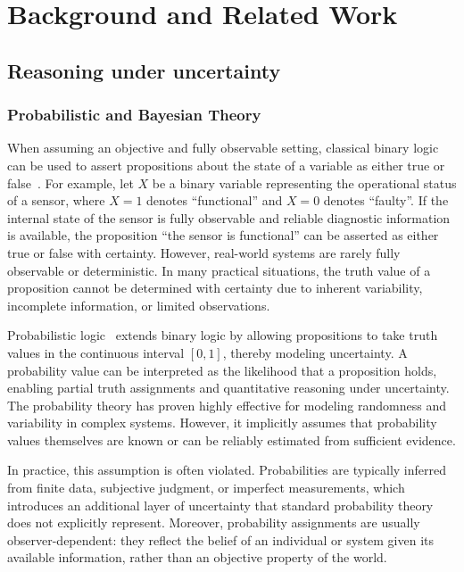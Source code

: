 


\chapter{Background and Related Work}
\label{chap:rw}
\section{Reasoning under uncertainty}
\subsection{Probabilistic and Bayesian Theory}

When assuming an objective and fully observable setting, classical binary logic can be used to assert propositions about the state of a variable as either true or false~\cite{boole1847mathematical}. For example, let $X$ be a binary variable representing the operational status of a sensor, where $X = 1$ denotes ``functional'' and $X = 0$ denotes ``faulty''.  If the internal state of the sensor is fully observable and reliable diagnostic information is available, the proposition ``the sensor is functional'' can be asserted as either true or false with certainty. However, real-world systems are rarely fully observable or deterministic. In many practical situations, the truth value of a proposition cannot be determined with certainty due to inherent variability, incomplete information, or limited observations.

Probabilistic logic~\cite{vonNeumann1956ProbabilisticLogics,Nilsson1986ProbabilisticLogic} extends binary logic by allowing propositions to take truth values in the continuous interval $[0,1]$, thereby modeling uncertainty. 
A probability value can be interpreted as the likelihood that a proposition holds, enabling partial truth assignments and quantitative reasoning under uncertainty. The probability theory has proven highly effective for modeling randomness and variability in complex systems. However, it implicitly assumes that probability values themselves are known or can be reliably estimated from sufficient evidence.

In practice, this assumption is often violated. Probabilities are typically inferred from finite data, subjective judgment, or imperfect measurements, which introduces an additional layer of uncertainty that standard probability theory does not explicitly represent. Moreover, probability assignments are usually observer-dependent: they reflect the belief of an individual or system given its available information, rather than an objective property of the world.

